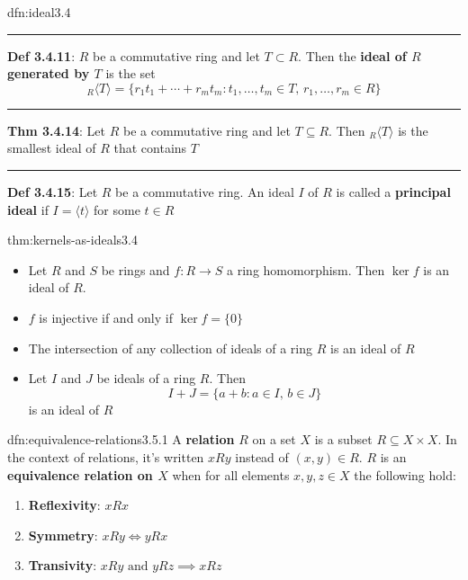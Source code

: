 \documentclass[landscape, 8pt]{extarticle}
\begin{document}
\begin{multicols}{3}
\begin{dfn}{dfn:ideal}{3.4}
    \vspace{-5pt}
    \noindent\rule{\textwidth}{0.2pt}
    \textbf{Def 3.4.11}: $R$ be a commutative ring and let $T \subset R$. Then the \textbf{ideal of $R$ generated by $T$} is the set
    \[{}_{R}\langle T \rangle = \{r_{1}t_{1}+\cdots+r_{m}t_{m} : t_{1},\dots,t_{m}\in T,\,r_{1},\dots,r_{m}\in R\}\]

    \vspace{-5pt}
    \noindent\rule{\textwidth}{0.2pt}
    \textbf{Thm 3.4.14}: Let $R$ be a commutative ring and let $T\subseteq R$. Then ${}_{R}\langle T \rangle$ is the smallest ideal of $R$ that contains $T$

    \noindent\rule{\textwidth}{0.2pt}
    \textbf{Def 3.4.15}: Let $R$ be a commutative ring. An ideal $I$ of $R$ is called a \textbf{principal ideal} if $I = \langle t \rangle$ for some $t\in R$
\end{dfn}

\vspace{-5pt}
\begin{thm}{thm:kernels-as-ideals}{3.4}

    \begin{itemize}
        \setlength\itemsep{0em}
        \item[\textbf{3.4.18}] Let $R$ and $S$ be rings and $f : R\to S$ a ring homomorphism. Then $\ker f$ is an ideal of $R$.
        \item[\textbf{3.4.20}] $f$ is injective if and only if $\ker f = \{0\}$
        \item[\textbf{3.4.21}] The intersection of any collection of ideals of a ring $R$ is an ideal of $R$
        \item[\textbf{3.4.22}] Let $I$ and $J$ be ideals of a ring $R$. Then
            \[I + J = \{a + b : a\in I,\, b\in J\}\]
            is an ideal of $R$
    \end{itemize}
\end{thm}


\begin{dfn}{dfn:equivalence-relations}{3.5.1}
    A \textbf{relation} $R$ on a set $X$ is a subset $R \subseteq X \times X $. In the context of relations, it's written $xRy$ instead of $(x,y)\in R$. $R$ is an \textbf{equivalence relation on $X$} when for all elements $x, y, z\in X$ the following hold:
    \begin{enumerate}
        \setlength\itemsep{0em}
        \item \textbf{Reflexivity}: $xRx$
        \item \textbf{Symmetry}: $xRy \iff yRx$
        \item \textbf{Transivity}: $xRy \text{ and } yRz \implies xRz$
    \end{enumerate}


\end{dfn}
\end{multicols}
\end{document}
